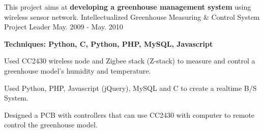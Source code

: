\begin{cventries}
  \cventry
    {This project aims at \textbf{developing a greenhouse management system} using wireless sensor network.}
    {Intellectualized Greenhouse Measuring \& Control System}
    {Project Leader}
    {May. 2009 - May. 2010}
    {
      \begin{cvitems}
            \item \textbf{Techniques: Python, C, Python, PHP, MySQL, Javascript} 
		\item{Used CC2430 wireless node and Zigbee stack (Z-stack) to measure and control a greenhouse model's humidity and temperature.}
		\item{Used Python, PHP, Javascript (jQuery), MySQL and C to create a realtime B/S System.}
		\item{Designed a PCB with controllers that can use CC2430 with computer to remote control the greenhouse model.}
      \end{cvitems}
    }
\end{cventries}


